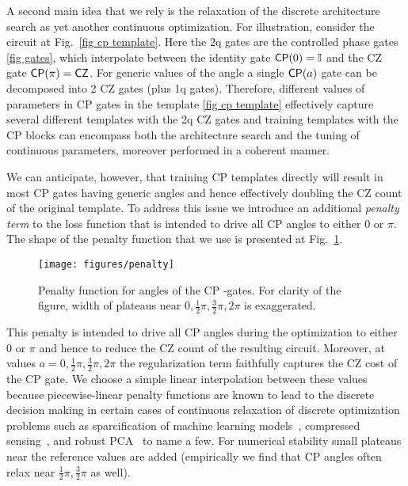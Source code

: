 \documentclass[twocolumn, amsfonts, amssymb, aps, nofootinbib]{revtex4-2}
\newcommand{\CZ}{\textsf{CZ }}
\newcommand{\CP}{\textsf{CP }}
\begin{document}
A second main idea that we rely is the relaxation of the discrete architecture search as yet another continuous optimization. For illustration, consider the circuit at Fig.~\ref{fig cp template}. Here the 2q gates are the controlled phase gates \eqref{fig gates}, which interpolate between the identity gate $\text{\textsf{CP}}(0)=\mathbb{I}$ and the \CZ gate $\text{\textsf{CP}}(\pi)=\text{\textsf{CZ}}$. For generic values of the angle a single $\text{\textsf{CP}}(a)$ gate can be decomposed into 2 \CZ gates (plus 1q gates). Therefore, different values of parameters in \CP gates in the template \eqref{fig cp template} effectively capture several different templates with the 2q \CZ gates and training templates with the \CP blocks can encompass both the architecture search and the tuning of continuous parameters, moreover performed in a coherent manner.

We can anticipate, however, that training \CP templates directly will result in most \CP gates having generic angles and hence effectively doubling the \CZ count of the original template. To address this issue we introduce an additional \textit{penalty term} to the loss function that is intended to drive all \CP angles to either $0$ or $\pi$. The shape of the penalty function that we use is presented at Fig.~\ref{fig penalty}.

\begin{figure}[h]
	\texttt{[image: figures/penalty]}
	\caption{Penalty function for angles of the \CP-gates. For clarity of the figure, width of plateaus near $0,\frac12\pi, \frac32\pi, 2\pi$ is exaggerated.}
	\label{fig penalty}
\end{figure}

This penalty is intended to drive all \CP angles during the optimization to either $0$ or $\pi$ and hence to reduce the \CZ count of the resulting circuit. Moreover, at values $a=0,\frac12\pi, \frac32\pi, 2\pi$ the regularization term faithfully captures the \CZ cost of the \CP gate. We choose a simple linear interpolation between these values because piecewise-linear penalty functions are known to lead to the discrete decision making in certain cases of continuous relaxation of discrete optimization problems such as sparcification of machine learning models~\cite{tibshirani1996regression}, compressed sensing~\cite{donoho2006most, candes2006robust}, and robust PCA~\cite{candes2011robust} to name a few. For numerical stability small plateaus near the reference values are added (empirically we find that \CP angles often relax near $\frac12\pi, \frac32\pi$ as well).
\end{document}
